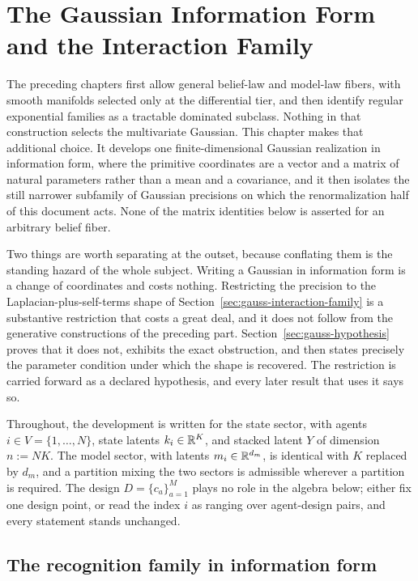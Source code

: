\chapter{The Gaussian Information Form and the Interaction Family}
\label{ch:gaussian}

The preceding chapters first allow general belief-law and model-law fibers, with smooth manifolds selected only at the differential tier, and then identify regular exponential families as a tractable dominated subclass. Nothing in that construction selects the multivariate Gaussian. This chapter makes that additional choice. It develops one finite-dimensional Gaussian realization in information form, where the primitive coordinates are a vector and a matrix of natural parameters rather than a mean and a covariance, and it then isolates the still narrower subfamily of Gaussian precisions on which the renormalization half of this document acts. None of the matrix identities below is asserted for an arbitrary belief fiber.

Two things are worth separating at the outset, because conflating them is the standing hazard of the whole subject. Writing a Gaussian in information form is a change of coordinates and costs nothing. Restricting the precision to the Laplacian-plus-self-terms shape of Section~\ref{sec:gauss-interaction-family} is a substantive restriction that costs a great deal, and it does not follow from the generative constructions of the preceding part. Section~\ref{sec:gauss-hypothesis} proves that it does not, exhibits the exact obstruction, and then states precisely the parameter condition under which the shape is recovered. The restriction is carried forward as a declared hypothesis, and every later result that uses it says so.

Throughout, the development is written for the state sector, with agents $i\in V=\{1,\dots,N\}$, state latents $k_i\in\mathbb R^{K}$, and stacked latent $Y$ of dimension $n:=NK$. The model sector, with latents $m_i\in\mathbb R^{d_m}$, is identical with $K$ replaced by $d_m$, and a partition mixing the two sectors is admissible wherever a partition is required. The design $D=\{c_a\}_{a=1}^{M}$ plays no role in the algebra below; either fix one design point, or read the index $i$ as ranging over agent-design pairs, and every statement stands unchanged.

\section{The recognition family in information form}
\label{sec:gauss-information-form}

